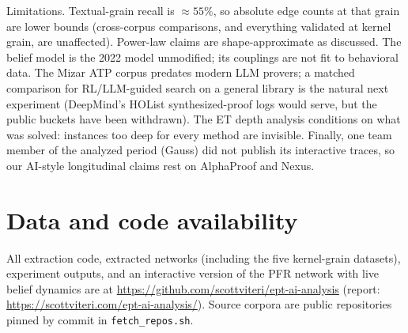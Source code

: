 \documentclass[11pt]{article}
\begin{document}
Limitations. Textual-grain recall is $\approx\!55\%$, so absolute edge counts at that grain are
lower bounds (cross-corpus comparisons, and everything validated at kernel grain, are
unaffected). Power-law claims are shape-approximate as discussed. The belief model is the 2022
model unmodified; its couplings are not fit to behavioral data. The Mizar ATP corpus predates
modern LLM provers; a matched comparison for RL/LLM-guided search on a general library is the
natural next experiment (DeepMind's HOList synthesized-proof logs would serve, but the public
buckets have been withdrawn). The ET depth analysis conditions on what was solved: instances
too deep for every method are invisible. Finally, one team member of the analyzed period
(Gauss) did not publish its interactive traces, so our AI-style longitudinal claims rest on
AlphaProof and Nexus.

\section*{Data and code availability}
All extraction code, extracted networks (including the five kernel-grain datasets), experiment
outputs, and an interactive version of the PFR network with live belief dynamics are at
\url{https://github.com/scottviteri/ept-ai-analysis} (report:
\url{https://scottviteri.com/ept-ai-analysis/}). Source corpora are public repositories pinned
by commit in \texttt{fetch\_repos.sh}.
\end{document}

